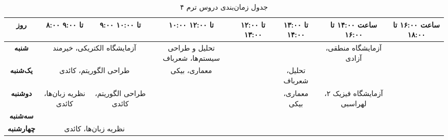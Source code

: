 \documentclass{article}
\begin{document}
	
 	\begin{sidewaystable}[h]
		\begin{center}	
 			\caption{جدول زمان‌بندی دروس ترم ۴}	
			\begin{tabular}{|c|c|c|c|c|c|c|c|c|c|c|}
				\hline
				روز & ۸:۰۰ تا ۹:۰۰ & ۹:۰۰ تا ۱۰:۰۰ &
     			\multicolumn{2}{|c|}{۱۰:۰۰ تا ۱۲:۰۰} &
     			۱۲:۰۰ تا ۱۳:۰۰ & ۱۳:۰۰ تا ۱۴:۰۰ &
				\multicolumn{2}{|c|}{ساعت ۱۴:۰۰ تا ۱۶:۰۰} &
				\multicolumn{2}{|c|}{ساعت ۱۶:۰۰ تا ۱۸:۰۰} \\
				\hline
				\hline
				
				\textbf{شنبه} &
				\multicolumn{2}{|c|}{آزمایشگاه الکتریکی، خیرمند} &
				\multicolumn{2}{|c|}{تحلیل و طراحی سیستم‌ها، شعرباف} &
				\multicolumn{2}{|c|}{} &
				\multicolumn{2}{|c|}{آزمایشگاه منطقی، آزادی} &
				\multicolumn{2}{|c|}{} \\
				\hline
				
				\textbf{یک‌شنبه} &
				\multicolumn{2}{|c|}{طراحی الگوریتم، کائدی} &
				\multicolumn{2}{|c|}{معماری، بیکی} &
				 & تحلیل، شعرباف &
				\multicolumn{2}{|c|}{} &
				\multicolumn{2}{|c|}{} \\
				\hline
				\textbf{دوشنبه} &
				نظریه زبان‌ها، کائدی & طراحی الگوریتم، کائدی &
				\multicolumn{2}{|c|}{} &
				& معماری، بیکی &
				\multicolumn{2}{|c|}{آزمایشگاه فیزیک ۲، لهراسبی} &
				\multicolumn{2}{|c|}{} \\
				\hline
				
				\textbf{سه‌شنبه} &
				\multicolumn{2}{|c|}{} &
                \multicolumn{2}{|c|}{} &
				\multicolumn{2}{|c|}{} &
				\multicolumn{2}{|c|}{} &
				\multicolumn{2}{|c|}{} \\
				\hline
				
				\textbf{چهارشنبه} &
				\multicolumn{2}{|c|}{نظریه زبان‌ها، کائدی} &
				\multicolumn{2}{|c|}{} &
				\multicolumn{2}{|c|}{} &
				\multicolumn{2}{|c|}{} &
				\multicolumn{2}{|c|}{} \\
				\hline
            \end{tabular}
		\end{center}
 	\end{sidewaystable}
\end{document}
